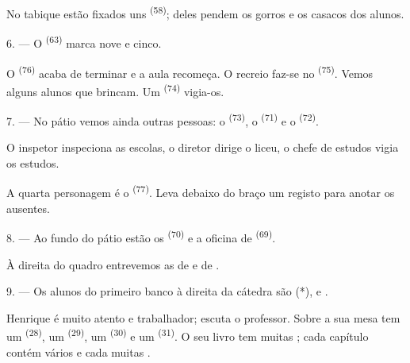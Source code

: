 No tabique estão fixados uns  \textsuperscript{(58)}; deles pendem
os gorros e os casacos dos alunos.

\VUsaut{5.2mm}
\VUsaut{3.6mm}

6. --- O  \textsuperscript{(63)} marca nove e cinco.

O  \textsuperscript{(76)} acaba de terminar e a aula recomeça. O
recreio faz-se no  \textsuperscript{(75)}. Vemos alguns alunos que
brincam. Um  \textsuperscript{(74)} vigia-os.

7. --- No pátio vemos ainda outras pessoas: o 
\textsuperscript{(73)}, o  \textsuperscript{(71)} e o
 \textsuperscript{(72)}.

O inspetor inspeciona as escolas, o diretor dirige o liceu, o chefe de
estudos vigia os estudos.

A quarta personagem é o  \textsuperscript{(77)}. Leva debaixo do
braço um registo para anotar os ausentes.

8. --- Ao fundo do pátio estão os 
\textsuperscript{(70)} e a oficina de 
\textsuperscript{(69)}.

À direita do quadro entrevemos as  de  e de
.


\VUsaut{2.4mm}

\VUsaut{3.0mm}

9. --- Os alunos do primeiro banco à direita da cátedra são
 (*),  e .

Henrique é muito atento e trabalhador; escuta o professor. Sobre a sua
mesa tem um  \textsuperscript{(28)}, um 
\textsuperscript{(29)}, um  \textsuperscript{(30)} e um
 \textsuperscript{(31)}. O seu livro tem muitas ;
cada capítulo contém vários  e cada 
muitas .


